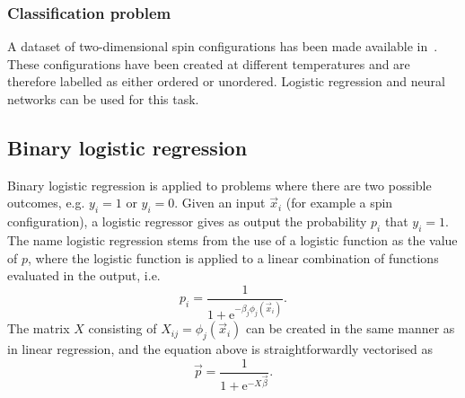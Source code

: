 \documentclass[11pt,british,a4paper]{article}
\renewcommand{\exp}[1]{\mathrm{e}^{#1}}
\numberwithin{equation}{section}
\begin{document}
\subsubsection{Classification problem}
A dataset of two-dimensional spin configurations has been made available in~\cite{mehta}. These configurations have been created at different temperatures and are therefore labelled as either ordered or unordered. Logistic regression and neural networks can be used for this task.

\subsection{Binary logistic regression}\label{subsec:logreg}
Binary logistic regression is applied to problems where there are two possible outcomes, e.g. \(y_i=1\) or \(y_i=0\). Given an input \(\vec{x}_i\) (for example a spin configuration), a logistic regressor gives as output the probability \(p_i\) that \(y_i=1\).
The name logistic regression stems from the use of a logistic function as the value of \(p\), where the logistic function is applied to a linear combination of functions evaluated in the output, i.e.
\begin{equation}
    p_i = \frac{1}{1 + \exp{-\beta_j \phi_j(\vec{x}_i)}}.
\end{equation}
The matrix \(X\) consisting of \(X_{ij} = \phi_j(\vec{x}_i)\) can be created in the same manner as in linear regression, and the equation above is straightforwardly vectorised as
\begin{equation}
    \vec{p} = \frac{1}{1 + \exp{-X\vec{\beta}}}.
\end{equation}
\end{document}
